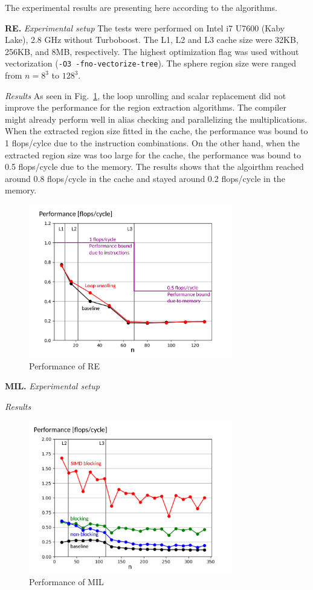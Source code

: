 \documentclass[letterpaper]{article}
\newcommand{\mypar}[1]{{\bf #1.}}
\begin{document}
The experimental results are presenting here according to the algorithms.

\mypar{RE} \textit{Experimental setup} The tests were performed on Intel i7 U7600 (Kaby Lake), 2.8 GHz without Turboboost. The L1, L2 and L3 cache size were 32KB, 256KB, and 8MB, respectively. The highest optimization flag was used without vectorization (\texttt{-O3 -fno-vectorize-tree}). The sphere region size were ranged from $n=8^{3}$ to $128^{3}$.

\textit{Results} As seen in Fig.~\ref{res:regions}, the loop unrolling and scalar replacement did not improve the performance for the region extraction algorithms. The compiler might already perform well in alias checking and parallelizing the multiplications. When the extracted region size fitted in the cache, the performance was bound to 1 flops/cylce due to the instruction combinations. On the other hand, when the extracted region size was too large for the cache, the performance was bound to 0.5 flops/cycle due to the memory. The results shows that the algoirthm reached around 0.8 flops/cycle in the cache and stayed around 0.2 flops/cycle in the memory.
   
\begin{figure}[H]
  \centering
 
  \includegraphics[width=3.5in]{figs/plots/regions/regions_performance.pdf}
  \caption{Performance of RE}
  \label{res:regions}
\end{figure}


\mypar{MIL} \textit{Experimental setup}

\textit{Results}

\begin{figure}[H]
  \centering
  \includegraphics[width=3.5in]{figs/plots/mil/mil_performance.pdf}
  \caption{Performance of MIL}
  \label{res:mil}
\end{figure}
\end{document}
